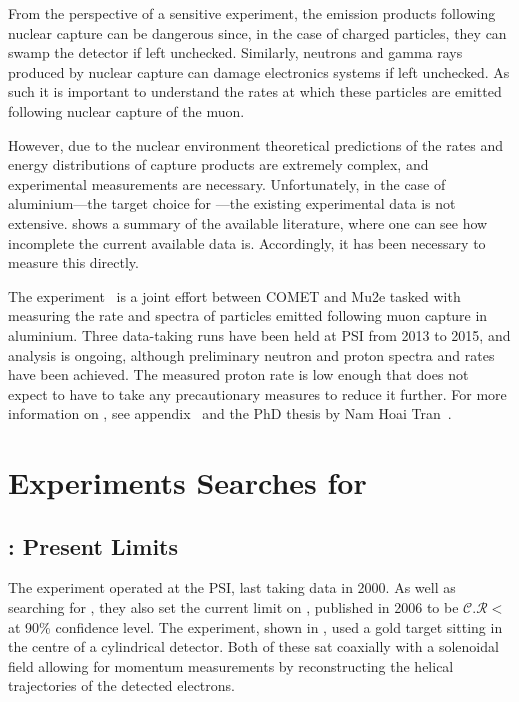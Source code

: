 From the perspective of a sensitive \mueconv experiment, the emission products following nuclear capture can be dangerous since, in the case of charged particles, they can swamp the detector if left unchecked.
Similarly, neutrons and gamma rays produced by nuclear capture can damage electronics systems if left unchecked.
As such it is important to understand the rates at which these particles are emitted following nuclear capture of the muon.

However, due to the nuclear environment theoretical predictions of the rates and energy distributions of capture products are extremely complex, and experimental measurements are necessary.
Unfortunately, in the case of aluminium---the target choice for \COMET---the existing experimental data is not extensive.
 shows a summary of the available literature, where one can see how incomplete the current available data is.
Accordingly, it has been necessary to measure this directly.

The \alcap experiment~\cite{AlcapProposal2012} is a joint effort between COMET and Mu2e tasked with measuring the rate and spectra of particles emitted following muon capture in aluminium.
Three data-taking runs have been held at \ac{PSI} from 2013 to 2015, and analysis is ongoing, although preliminary neutron and proton spectra and rates have been achieved.
The measured proton rate is low enough that \COMET does not expect to have to take any precautionary measures to reduce it further.
For more information on \alcap, see appendix~ and the PhD thesis by Nam Hoai Tran~\cite{NamThesis}.

\section{Experiments Searches for \mueconv }
\subsection{\sindrumII: Present Limits}
\FigMuecSindrumII
The \sindrumII experiment operated at the \ac{PSI}, last taking data in 2000.
As well as searching for \muThreeE, they also set the 
current limit on \mueconv, published in 2006 to be $\mathcal{C.R}<$\senseSindrum at 90\% confidence level.
The experiment, shown in , used a gold target sitting in the centre of a cylindrical detector.
Both of these sat coaxially with a solenoidal field allowing for momentum measurements by reconstructing the helical trajectories of the detected electrons.

